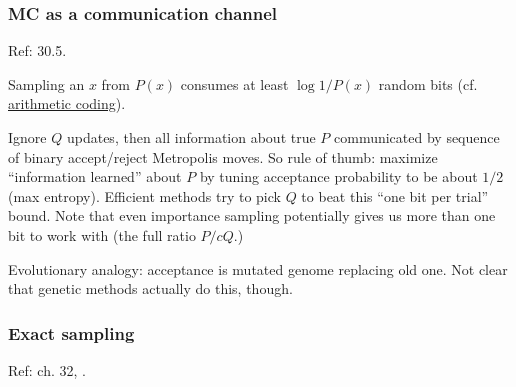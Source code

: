 \documentclass[notitlepage,openany,11pt]{report}
\theoremstyle{plain}%
\numberwithin{equation}{section}
\begin{document}
\subsubsection{MC as a communication channel} 

Ref: \cite{MacKay:03} 30.5.  

Sampling an $x$ from $P(x)$ consumes at least $\log 1/P(x)$ random bits (cf. \href{https://en.wikipedia.org/wiki/Arithmetic_coding}{arithmetic coding}). 

Ignore $Q$ updates, then all information about true $P$ communicated by sequence of binary accept/reject Metropolis moves. So rule of thumb: maximize ``information learned'' about $P$ by tuning acceptance probability to be about $1/2$ (max entropy). Efficient methods try to pick $Q$ to beat this ``one bit per trial'' bound. Note that even importance sampling potentially gives us more than one bit to work with (the full ratio $P/ cQ$.)

Evolutionary analogy: acceptance is mutated genome replacing old one. Not clear that genetic methods actually do this, though. 

\subsubsection{Exact sampling} 
Ref: \cite{MacKay:03} ch. 32, \cite{ProppWilson:96}. 
\end{document}
